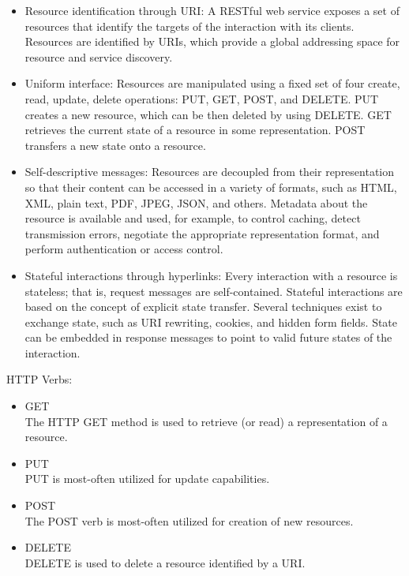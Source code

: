 \documentclass[12pt]{article}
\begin{document}
\begin{itemize}
\item Resource identification through URI: 
A RESTful web service exposes a set of resources that identify the targets of the interaction with its clients. Resources are identified by URIs, which provide a global addressing space for resource and service discovery.\\
\item Uniform interface: 
Resources are manipulated using a fixed set of four create, read, update, delete operations: PUT, GET, POST, and DELETE. PUT creates a new resource, which can be then deleted by using DELETE. GET retrieves the current state of a resource in some representation. POST transfers a new state onto a resource.\\
\item Self-descriptive messages: 
Resources are decoupled from their representation so that their content can be accessed in a variety of formats, such as HTML, XML, plain text, PDF, JPEG, JSON, and others. Metadata about the resource is available and used, for example, to control caching, detect transmission errors, negotiate the appropriate representation format, and perform authentication or access control. \\
\item Stateful interactions through hyperlinks:
Every interaction with a resource is stateless; that is, request messages are self-contained. Stateful interactions are based on the concept of explicit state transfer. Several techniques exist to exchange state, such as URI rewriting, cookies, and hidden form fields. State can be embedded in response messages to point to valid future states of the interaction.\\
\end{itemize}
HTTP Verbs:
\begin{itemize}
\item GET\\
The HTTP GET method is used to retrieve (or read) a representation of a resource.
\item PUT\\
PUT is most-often utilized for update capabilities.
\item POST\\
The POST verb is most-often utilized for creation of new resources.
\item DELETE\\
DELETE is used to delete a resource identified by a URI.\cite{RESTful}
\end{itemize}
\end{document}
